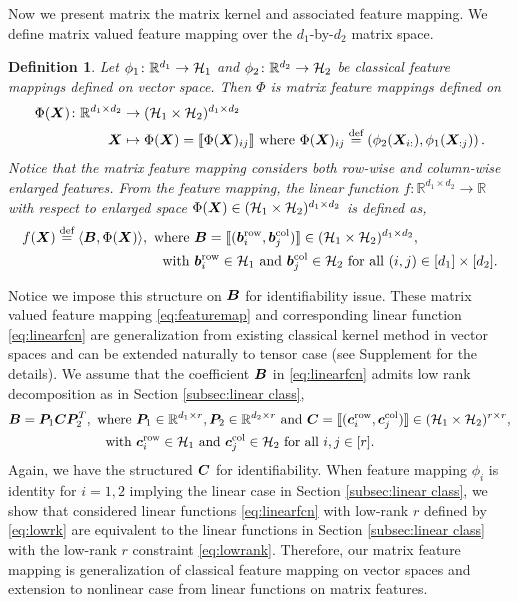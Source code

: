 \documentclass[12pt]{article}
\newtheorem{defn}{Definition}
\begin{document}
Now we present matrix the matrix kernel and associated feature mapping.
We define matrix valued feature mapping over  the $d_1$-by-$d_2$ matrix space.
\begin{defn}\label{def:map}
Let $\phi_1\colon\mathbb{R}^{d_1}\rightarrow \mathcal{H}_1 $ and $\phi_2\colon\mathbb{R}^{d_2}\rightarrow \mathcal{H}_2 $  be classical feature mappings defined on vector space. Then $\Phi$ is matrix feature mappings defined on
\begin{align}\label{eq:featuremap}
    \Phi(\bm X)\colon \mathbb{R}^{d_1\times d_2} &\rightarrow (\mathcal{H}_1\times \mathcal{H}_2)^{d_1\times d_2}\\
    \bm X &\mapsto \Phi(\bm X) = \llbracket \Phi(\bm X)_{ij} \rrbracket\text{ where } \Phi(\bm X)_{ij}\stackrel{\text{def}}{=}\left(\phi_2(\bm X_{i:}),\phi_1(\bm X_{:j})\right).
\end{align}
Notice that the matrix feature mapping considers both row-wise and column-wise enlarged features.
From the feature mapping, the linear function $f\colon \mathbb{R}^{d_1\times d_2}\rightarrow \mathbb{R}$ with respect to enlarged space $\Phi(\bm X)\in(\mathcal{H}_1\times \mathcal{H}_2)^{d_1\times d_2}$ is defined as,
\begin{align}\label{eq:linearfcn}
    f(\bm X) \stackrel{\text{def}}{=}\langle \bm B,\Phi(\bm X) \rangle ,\text{ where }& \bm B=\llbracket (\bm{b}^{\text{row}}_i,\bm{b}^{\text{col}}_j) \rrbracket\in(\mathcal{H}_1\times \mathcal{H}_2)^{d_1\times d_2},\\\text{ with }& \bm{b}^{\text{row}}_i\in\mathcal{H}_1\text{ and } \bm{b}^{\text{col}}_j\in\mathcal{H}_2 \text{ for all } (i,j)\in[d_1]\times[d_2].
\end{align}
\end{defn}
Notice we impose this structure on $\bm B$ for identifiability issue.
These matrix valued feature mapping \eqref{eq:featuremap} and corresponding linear function \eqref{eq:linearfcn} are generalization from existing classical kernel method in vector spaces and can be extended naturally to tensor case (see Supplement for the details).
 We assume that the coefficient $\bm B$ in \eqref{eq:linearfcn} admits low rank decomposition as in Section \ref{subsec:linear class}, 
 \begin{align}\label{eq:lowrk}
     \bm B = \bm{P}_1\bm C\bm{P}_2^T,\text{ where }& \bm{P}_1\in\mathbb{R}^{d_1\times r},\bm{P}_2\in\mathbb{R}^{d_2\times r} \text{ and } \bm C = \llbracket (\bm{c}_i^{\text{row}},\bm{c}_j^{\text{col}}) \rrbracket\in(\mathcal{H}_1\times \mathcal{H}_2)^{r\times r},\\
     \text{ with }&\bm{c}^{\text{row}}_i\in\mathcal{H}_1\text{ and } \bm{c}^{\text{col}}_j\in\mathcal{H}_2 \text{ for all } i,j\in[r].
 \end{align}
 Again, we have the structured $\bm C$ for identifiability. 
  When feature mapping $\phi_i$ is identity for $i=1,2$ implying the linear case in Section \ref{subsec:linear class}, we show that considered linear functions \eqref{eq:linearfcn} with low-rank $r$ defined by \eqref{eq:lowrk} are equivalent to the linear functions in Section \ref{subsec:linear class} with the low-rank $r$ constraint \eqref{eq:lowrank}.
  Therefore, our matrix feature mapping is generalization of classical feature mapping on vector spaces and extension to nonlinear case from linear functions on matrix features.
  
\end{document}
